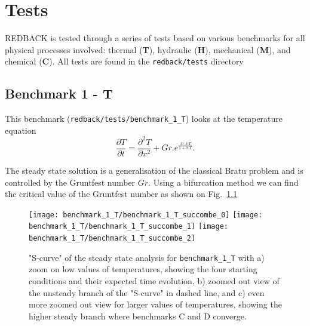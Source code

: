\documentclass[]{scrreprt}
\newcommand{\redback}{{REDBACK}}
\begin{document}
\chapter{Tests}
\label{chapter:tests}

\redback{} is tested through a series of tests based on various benchmarks for all physical processes involved: thermal (\textbf{T}), hydraulic (\textbf{H}), mechanical (\textbf{M}), and chemical (\textbf{C}). All tests are found in the \texttt{redback/tests} directory
\section{Benchmark 1 - T}

This benchmark (\texttt{redback/tests/benchmark\_1\_T}) looks at the temperature equation 
\begin{equation}
\frac{\partial T}{\partial t} = \frac{\partial^2 T}{\partial x^2} + Gr . e^{\frac{Ar. \delta.T}{1+\delta.T}}.
\end{equation}

The steady state solution is a generalisation of the classical Bratu problem \citep{Bratu1914} and is controlled by the Gruntfest number $Gr$. Using a bifurcation method \citep{Succombe2015} we can find the critical value of the Gruntfest number as shown on Fig.~\ref{fig:benchmark_1_T_succombe}

\begin{figure}
  \centering
  \texttt{[image: benchmark\_1\_T/benchmark\_1\_T\_succombe\_0]}
  \texttt{[image: benchmark\_1\_T/benchmark\_1\_T\_succombe\_1]}
  \texttt{[image: benchmark\_1\_T/benchmark\_1\_T\_succombe\_2]}
  \caption{"S-curve" of the steady state analysis for \texttt{benchmark\_1\_T} with a) zoom on low values of temperatures, showing the four starting conditions and their expected time evolution, b) zoomed out view of the unsteady branch of the "S-curve" in dashed line, and c) even more zoomed out view for larger values of temperatures, showing the higher steady branch where benchmarks C and D converge.}
  \label{fig:benchmark_1_T_succombe}
\end{figure}
\end{document}
